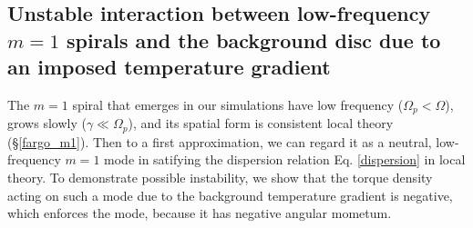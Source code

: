 \subsection{Unstable interaction between low-frequency $m=1$ spirals
  and the background disc due to an imposed temperature gradient}
The $m=1$ spiral that emerges in our simulations have low frequency
($\Omega_p < \Omega$),
grows slowly ($\gamma\ll\Omega_p$), and its spatial form is consistent local theory  
(\S\ref{fargo_m1}). Then to a first approximation, we can regard it 
as a neutral, low-frequency $m=1$ mode in satifying the 
dispersion relation Eq. \ref{dispersion} in local theory.  %
To demonstrate possible instability, %
we show that the torque density acting on such a mode due to the background
temperature gradient is negative, which enforces the mode, because it
has negative angular mometum.  


